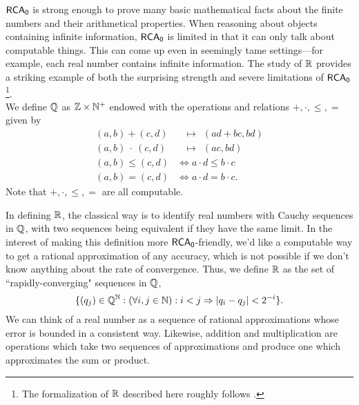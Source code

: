 \documentclass{amsart}
\begin{document}
	
	$\operatorname{\sf{RCA_0}}$ is strong enough to prove many basic mathematical facts about the finite numbers and their arithmetical properties. When reasoning about objects containing infinite information, $\operatorname{\sf{RCA_0}}$ is limited in that it can only talk about computable things. This can come up even in seemingly tame settings---for example, each real number contains infinite information. The study of $\mathbb{R}$ provides a striking example of both the surprising strength and severe limitations of $\operatorname{\sf{RCA_0}}$\footnote{The formalization of $\mathbb{R}$ described here roughly follows \cite{simpson}.}.\\
	
	We define $\mathbb{Q}$ as $\mathbb{Z}\times \mathbb{N}^+$ endowed with the operations and relations $+,\cdot,\leq ,=$ given by
	\begin{align*}
		(a,b) + (c,d) &\;\;\,\mapsto\;\, (ad+bc,bd)\\
		(a,b) \: \cdot \: (c,d) &\;\;\,\mapsto \;\,(ac,bd)\\
		(a,b) \leq (c,d) &\iff a\cdot d \leq b\cdot c\\
		(a,b) = (c,d) &\iff a\cdot d = b\cdot c.
	\end{align*}
	Note that $+,\cdot,\leq,=$ are all computable.
	
	In defining $\mathbb{R}$, the classical way is to identify real numbers with Cauchy sequences in $\mathbb{Q}$, with two sequences being equivalent if they have the same limit. In the interest of making this definition more $\operatorname{\sf{RCA_0}}$-friendly, we'd like a computable way to get a rational approximation of any accuracy, which is not possible if we don't know anything about the rate of convergence. Thus, we define $\mathbb{R}$ as the set of ``rapidly-converging" sequences in $\mathbb{Q}$,
	$$
	\{(q_j) \in \mathbb{Q}^{\mathbb{N}} : (\forall i,j\in \mathbb{N}): i<j \Rightarrow |q_i-q_j|<2^{-i}\}.
	$$
	We can think of a real number as a sequence of rational approximations whose error is bounded in a consistent way. Likewise, addition and multiplication are operations which take two sequences of approximations and produce one which approximates the sum or product.
	
\end{document}
